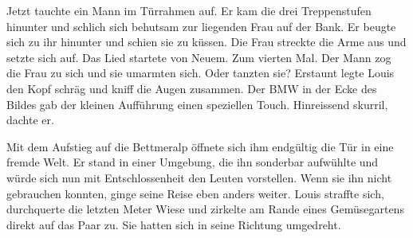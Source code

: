 Jetzt tauchte ein Mann im Türrahmen auf. Er kam die drei Treppenstufen
hinunter und schlich sich behutsam zur liegenden Frau auf der Bank. Er
beugte sich zu ihr hinunter und schien sie zu küssen. Die Frau streckte
die Arme aus und setzte sich auf. Das Lied startete von Neuem. Zum
vierten Mal. Der Mann zog die Frau zu sich und sie umarmten sich. Oder
tanzten sie?
Erstaunt legte Louis den Kopf schräg und kniff die Augen zusammen. Der
BMW in der Ecke des Bildes gab der kleinen Aufführung einen
speziellen Touch. Hinreissend skurril, dachte er. 

Mit dem Aufstieg auf die Bettmeralp öffnete sich ihm endgültig die Tür in eine fremde Welt. 
Er stand in einer Umgebung, die ihn sonderbar aufwühlte und
würde sich nun mit Entschlossenheit den Leuten vorstellen. Wenn sie ihn
nicht gebrauchen konnten, ginge seine Reise eben anders weiter. Louis
straffte sich, durchquerte die letzten Meter Wiese und zirkelte am Rande
eines Gemüsegartens direkt auf das Paar zu. Sie hatten sich in seine
Richtung umgedreht.
